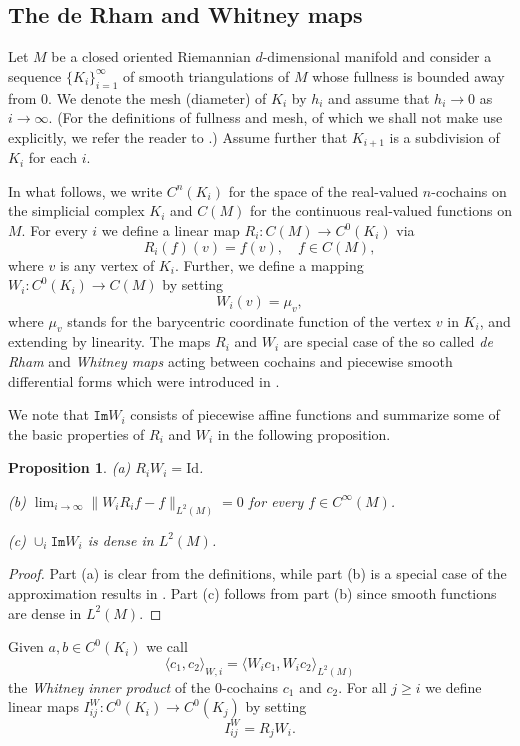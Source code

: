\documentclass[11pt,reqno]{amsart}
\numberwithin{equation}{section}
\newtheorem{proposition}[theorem]{Proposition}
\theoremstyle{remark}
\theoremstyle{rmdefinition}
\begin{document}
\subsection{The de Rham and Whitney maps}\label{derhamwhisec}
Let $M$ be a closed oriented Riemannian $d$-dimensional manifold and consider a sequence $\{K_{i}\}_{i=1}^{\infty}$ of smooth triangulations of $M$ whose fullness is bounded away from 0. We denote the mesh (diameter) of $K_{i}$ by $h_{i}$ and assume that $h_{i}\rightarrow 0$  as $i \rightarrow \infty$. (For the definitions of fullness and mesh, of which we shall not make use explicitly, we refer the reader to \cite[Section 2]{DP}.) Assume further that $K_{i+1}$ is a subdivision of $K_{i}$ for each $i$. 

In what follows, we write $C^n(K_{i})$ for the space of the real-valued $n$-cochains on the simplicial complex $K_{i}$ and $C(M)$ for the continuous real-valued functions on $M$. For every $i$ we define a linear map $R_i: C(M) \rightarrow C^0(K_{i})$ via
$$ R_i(f)(v)=f(v), \quad f \in C(M),$$
where $v$ is any vertex of $K_{i}$. Further, we define a mapping $W_i: C^0(K_{i}) \rightarrow C(M)$ by setting
\begin{equation}\label{whimapdefi}
 W_i(v)=\mu_v,
\end{equation} 
where $\mu_v$ stands for the barycentric coordinate function of the vertex $v$ in $K_{i}$, and extending by linearity. The maps $R_i$ and $W_i$ are special case of the so called {\em de Rham} and {\em Whitney maps} acting between cochains and piecewise smooth differential forms which were introduced in \cite{Do}.

We note that $\mathtt{Im}W_i$ consists of piecewise affine functions and summarize some of the basic properties of $R_i$ and $W_i$ in the following proposition.

\begin{proposition}\label{whitmapprope} (a) $R_{i}W_{i}=\text{Id}$.
	
	(b) $\lim_{i \rightarrow \infty} \|W_{i}R_{i}f-f\|_{L^2(M)}=0$ for every $f \in C^{\infty}(M)$.
	
	(c) $\cup_{i}\mathtt{Im}W_i$ is dense in $L^2(M)$.
	\end{proposition}
	\begin{proof}
Part (a) is clear from the definitions, while part (b) is a special case of the approximation results in \cite[Section 2]{DP}. Part (c) follows from part (b) since smooth functions are dense in $L^2(M)$.
	\end{proof}
Given $a,b \in C^0(K_{i})$ we call
\begin{equation}\label{whitinnerp}
\langle c_1,c_2\rangle_{W,i} = \langle W_{i}c_1, W_{i}c_2\rangle_{L^2(M)}
\end{equation}
the {\em Whitney inner product} of the 0-cochains $c_1$ and $c_2$. For all $j\geq i$ we define linear maps
$I_{ij}^{W}:  C^0(K_{i}) \rightarrow C^0(K_{j})$ by setting
\begin{equation}\label{imapdefi}
I_{ij}^{W}= R_j W_i.
\end{equation} 
\end{document}
